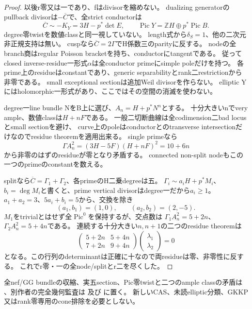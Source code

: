 \documentclass[a4paper,11pt]{ltjsarticle}
\theoremstyle{definition}
\begin{document}
\begin{proof}
以後r零又は一であり、fはdivisorを縮めない。
dualizing generatorのpullback divisorは$-\overline C$で、全strict conductorは
\[
 \overline C\sim-K_Y=3H-p^*\det E,
 \qquad\operatorname{Pic}Y=\mathbb ZH\oplus p^*\operatorname{Pic}B.
\]
degree零twistを数値classと同一視していない。
length式から$\delta_S=1$、他の二次元非正規支持は無い。
cuspなら$\overline C=2\Gamma$でH係数三のparityに反する。
nodeの全branch商はregular Poisson bracketを持ち、conductorにtangentである。
従ってclosed inverse-residue一形式$\alpha$は全conductor primeにsimple poleだけを持つ。
各prime上のresidueはconstantであり、generic separabilityとrank二restrictionから非零である。
small exceptional sectionは追加Weil divisorを作らない。
elliptic Yにはholomorphic一形式があり、ここではその空間の消滅を使わない。

degree一line bundle NをB上に選び、$A_n=H+p^*N^n$とする。
十分大きいnでvery ample、数値classは$H+nF$である。
一般二切断曲線は全codimension二bad locusとsmall sectionを避け、
curve上のpoleはconductorとのtransverse intersectionだけなのでresidue theoremを適用出来る。
single primeなら
\[
 \Gamma A_n^2=(3H-5F)(H+nF)^2=10+6n
\]
から非零のはずのresidueが零となり矛盾する。
connected non-split nodeもこの一つのprimeのconstantを数える。

splitなら$\overline C=\Gamma_1+\Gamma_2$、各primeのH二乗degreeは五。
$\Gamma_i\sim a_iH+p^*M_i$、$b_i=\deg M_i$と書くと、prime vertical divisorはdegree一だから$a_i\ge1$。
$a_1+a_2=3$、$5a_i+b_i=5$から、交換を除き
\[
 (a_1,b_1)=(1,0),\qquad(a_2,b_2)=(2,-5).
\]
$M_1$をtrivialとはせず全$\operatorname{Pic}^0$を保持するが、交点数は
$\Gamma_1A_n^2=5+2n$、$\Gamma_2A_n^2=5+4n$である。
連続する十分大きい$n,n+1$の二つのresidue theoremは
\[
 \begin{pmatrix}5+2n&5+4n\\7+2n&9+4n\end{pmatrix}
 \begin{pmatrix}\lambda_1\\\lambda_2\end{pmatrix}=0
\]
となる。この行列のdeterminantは正確に十なので両residueは零、非零性に反する。
これでr零・一の全node/splitとr二を尽くした。
\end{proof}
全nef/GG bundleの収縮、実五section、Pic零twistと二つのample classの矛盾は
、別作者の完全幾何監査は
及び
に置く。
新しいCAS、未読elliptic分類、GKKP又はrank零専用のcone排除を必要としない。
\end{document}
